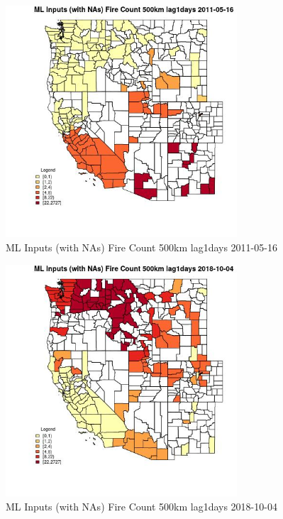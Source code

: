 \begin{figure} 
\centering  
\includegraphics[width=0.77\textwidth]{Code_Outputs/Report_ML_input_PM25_Step4_part_f_de_duplicated_aves_prioritize_24hr_obswNAs_CountyFire_Count_500km_lag1daysMean2011-05-16.jpg} 
\caption{\label{fig:Report_ML_input_PM25_Step4_part_f_de_duplicated_aves_prioritize_24hr_obswNAsCountyFire_Count_500km_lag1daysMean2011-05-16}ML Inputs (with NAs) Fire Count 500km lag1days 2011-05-16} 
\end{figure} 
 

\begin{figure} 
\centering  
\includegraphics[width=0.77\textwidth]{Code_Outputs/Report_ML_input_PM25_Step4_part_f_de_duplicated_aves_prioritize_24hr_obswNAs_CountyFire_Count_500km_lag1daysMean2018-10-04.jpg} 
\caption{\label{fig:Report_ML_input_PM25_Step4_part_f_de_duplicated_aves_prioritize_24hr_obswNAsCountyFire_Count_500km_lag1daysMean2018-10-04}ML Inputs (with NAs) Fire Count 500km lag1days 2018-10-04} 
\end{figure} 
 


